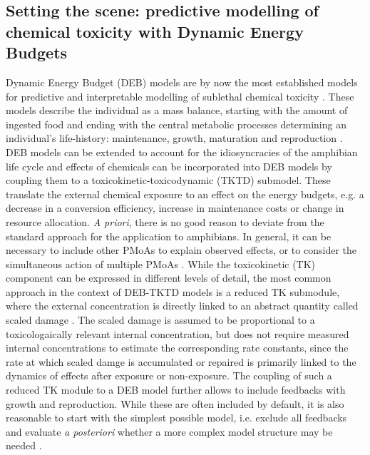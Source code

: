 \documentclass[preprint,12pt]{elsarticle}
\begin{document}
\subsection{Setting the scene: predictive modelling of chemical toxicity with Dynamic Energy Budgets}
%
Dynamic Energy Budget (DEB) models are by now the most established models 
for predictive and interpretable modelling of sublethal chemical toxicity 
\citep{jagerSimplifiedDynamicEnergy2012,martinExtrapolatingEcotoxicologicalEffects2013,sherborneModelingSublethalEffects2020,romoliEnvironmentalRiskAssessment2024}. 
These models describe the individual as a mass balance, 
starting with the amount of ingested food and ending with the central metabolic processes determining an 
individual's life-history:  
maintenance, growth, maturation and reproduction \citep{kooijmanDynamicEnergyBudget2010,jagerDEBkissQuestSimplest2013}.
DEB models can be extended to account for the idiosyncracies of the amphibian life cycle \citep{romoliDynamicEnergyBudget2024,hansulDynamicEnergyBudget2026} and
effects of chemicals can be incorporated into DEB models by coupling them to a toxicokinetic-toxicodynamic (TKTD) submodel. 
These translate the external chemical exposure to an effect on the energy budgets, 
e.g. a decrease in a conversion efficiency, increase in maintenance costs or change in resource allocation.
\textit{A priori}, there is no good reason to deviate from 
the standard approach for the application to amphibians. 
In general, it can be necessary to include other PMoAs to explain 
observed effects, 
or to consider the simultaneous action of multiple PMoAs \citep{kochMakingSenseLifeHistory2021}.
While the toxicokinetic (TK) component can be expressed in different levels of detail, 
the most common approach in the context of DEB-TKTD models is a reduced TK submodule, where the external concentration is directly linked to an abstract quantity 
called scaled damage \citep{jagerRevisitingSimplifiedDEBtox2020}. 
The scaled damage is assumed to be proportional to a toxicologaically relevant internal concentration, 
but does not require measured internal concentrations to estimate the corresponding rate constants, 
since the rate at which scaled damge is accumulated or repaired is primarily linked to the dynamics of effects after exposure or non-exposure. 
The coupling of such a reduced TK module to a DEB model further allows to include feedbacks with growth and reproduction. 
While these are often included by default, it is also reasonable to start with the simplest possible model, i.e. exclude all feedbacks 
and evaluate \textit{a posteriori} whether a more complex model structure may be needed \citep{jagerRevisitingSimplifiedDEBtox2020,efsapanelonplantprotectionproductsandtheirresiduespprScientificOpinionState2018a}. 
\end{document}
